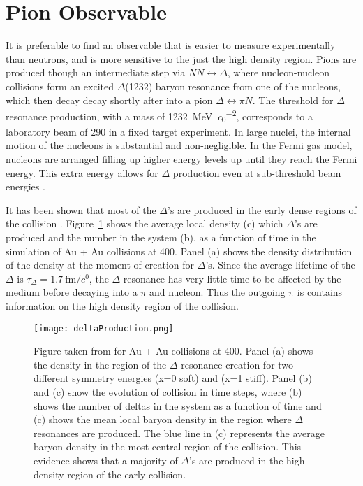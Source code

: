 \section{Pion Observable}
It is preferable to find an observable that is easier to measure experimentally than neutrons, and is more sensitive to the just the high density region. Pions are produced though an intermediate step via $ NN \leftrightarrow \Delta$, where nucleon-nucleon collisions form an excited $\Delta$(1232) baryon resonance from one of the nucleons, which then decay decay shortly after into a pion $\Delta \leftrightarrow \pi N$. The threshold for $\Delta$ resonance production, with a mass of \SI{1232}{\mega\electronvolt\per\clight\squared}, corresponds to a laboratory beam of \SI{290}{\MeVA} in a fixed target experiment. In large nuclei, the internal motion of the nucleons is substantial and non-negligible. In the Fermi gas model, nucleons are arranged filling up higher energy levels up until they reach the Fermi energy. This extra energy allows for $\Delta$ production even at sub-threshold beam energies \cite{fermiEnergy}.


It has been shown that most of the $\Delta$'s are produced in the early dense regions of the collision \cite{mingzhang}. Figure~\ref{fig:deltaProduction} shows the average local density (c) which $\Delta$'s are produced and the number in the system (b), as a function of time in the simulation of Au + Au collisions at \SI{400}{\MeVA}. Panel (a) shows the density distribution of the density at the moment of creation for $\Delta$'s. Since the average lifetime of the $\Delta$  is $\tau_{\Delta} = \SI{1.7}{\femto\metre\per\clight}$, the $\Delta$ resonance has very little time to be affected by the medium before decaying into a $\pi$ and nucleon. Thus the outgoing $\pi$ is contains information on the high density region of the collision. 

\begin{figure}[!htb]
\centering
\texttt{[image: deltaProduction.png]}
\caption{Figure taken from \cite{mingzhang} for Au + Au collisions at \SI{400}{\MeVA}. Panel (a) shows the density in the region of the $\Delta$ resonance creation for two different symmetry energies (x=0 soft) and (x=1 stiff). Panel (b) and (c) show the evolution of collision in time steps, where (b) shows the number of deltas in the system as a function of time and (c) shows the mean local baryon density in the region where $\Delta$ resonances are produced. The blue line in (c) represents the average baryon density in the most central region of the collision. This evidence shows that a majority of $\Delta$'s are produced in the high density region of the early collision.}
\label{fig:deltaProduction}
\end{figure}

